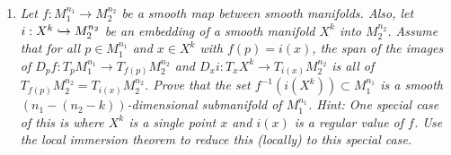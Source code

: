 \documentclass{article}
\begin{document}
\begin{enumerate}[label={\bf Q\arabic*:}]
\begin{proof}

    \end{proof}

  \item \it Let $f:M_1^{n_1}\rightarrow M_2^{n_2}$ be a smooth map between
    smooth manifolds. Also, let $i:X^k\xhookrightarrow{}M_2^{n_2}$ be an
    embedding of a smooth manifold $X^k$ into $M_2^{n_2}$. Assume that for
    all $p\in M_1^{n_1}$ and $x\in X^k$ with $f(p)=i(x)$, the span of the
    images of $D_pf:T_pM_1^{n_1}\rightarrow T_{f(p)}M_2^{n_2}$ and
    $D_xi:T_xX^k\rightarrow T_{i(x)}M_2^{n_2}$ is all of
    $T_{f(p)}M_2^{n_2}=T_{i(x)}M_2^{n_2}$. Prove that the set
    $f^{-1}(i(X^k))\subset M_1^{n_1}$ is a smooth
    $(n_1-(n_2-k))$-dimensional submanifold of $M_1^{n_1}$. Hint: One
    special case of this is where $X^k$ is a single point $x$ and $i(x)$ is
    a regular value of $f$. Use the local immersion theorem to reduce this
    (locally) to this special case.


\end{enumerate}
\end{document}
